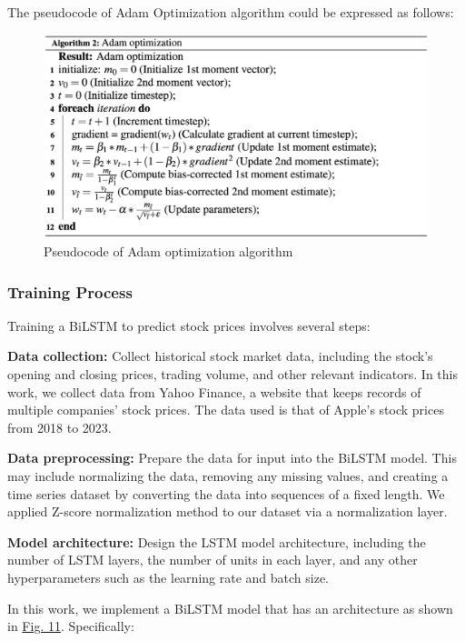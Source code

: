 \documentclass[a4paper]{article}
\begin{document}
The pseudocode of Adam Optimization algorithm could be expressed as follows:

\begin{figure}
    \centering
    \includegraphics[width=15cm]{adam.png}
    \caption{Pseudocode of Adam optimization algorithm}
    \label{fig:adam}
\end{figure}
\subsubsection{Training Process}

Training a BiLSTM to predict stock prices involves several steps:

\textbf{Data collection:} Collect historical stock market data, including the stock's opening and closing prices, trading volume, and other relevant indicators. In this work, we collect data from Yahoo Finance, a website that keeps records of multiple companies' stock prices. The data used is that of Apple's stock prices from 2018 to 2023.

\textbf{Data preprocessing:} Prepare the data for input into the BiLSTM model. This may include normalizing the data, removing any missing values, and creating a time series dataset by converting the data into sequences of a fixed length. We applied Z-score normalization method to our dataset via a normalization layer.

\textbf{Model architecture:} Design the LSTM model architecture, including the number of LSTM layers, the number of units in each layer, and any other hyperparameters such as the learning rate and batch size.

In this work, we implement a BiLSTM model that has an architecture as shown in \hyperref[fig:architecture]{Fig. 11}. Specifically:
\end{document}
